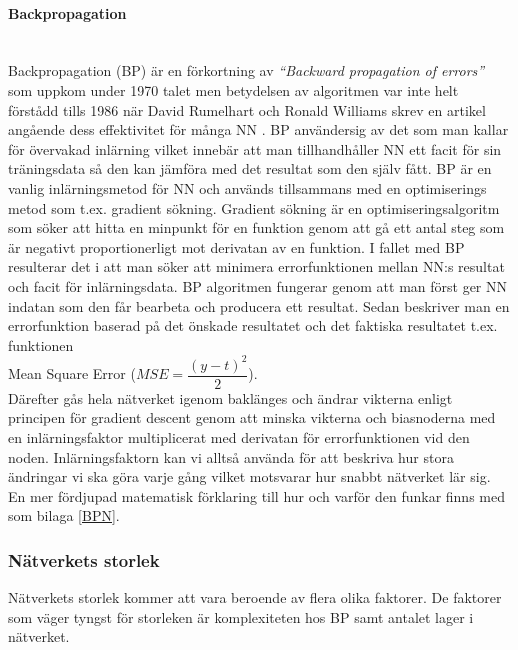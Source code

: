 \documentclass[a4paper,10pt]{article}
\begin{document}
\paragraph{Backpropagation}\hspace{0pt}\\
Backpropagation (BP) är en förkortning av \emph{``Backward propagation of errors''} \autocite{BP} som uppkom under 1970 talet men betydelsen av algoritmen var inte helt förstådd tills 1986 när David Rumelhart och Ronald Williams skrev en artikel angående dess effektivitet för många NN \autocite{NNDL}. BP användersig av det som man kallar för övervakad inlärning vilket innebär att man tillhandhåller NN ett facit för sin träningsdata så den kan jämföra med det resultat som den själv fått. BP är en vanlig inlärningsmetod för NN och används tillsammans med en optimiserings metod som t.ex. gradient sökning. Gradient sökning är en optimiseringsalgoritm som söker att hitta en minpunkt för en funktion genom att gå ett antal steg som är negativt proportionerligt mot derivatan av en funktion\autocite{GD}. I fallet med BP resulterar det i att man söker att minimera errorfunktionen mellan NN:s resultat och facit för inlärningsdata.
BP algoritmen fungerar genom att man först ger NN indatan som den får bearbeta och producera ett resultat. Sedan beskriver man en errorfunktion baserad på det önskade resultatet och det faktiska resultatet t.ex. funktionen \\Mean Square Error ($MSE = \dfrac{(y-t)^2}{2}$). \\Därefter gås hela nätverket igenom baklänges och ändrar vikterna enligt principen för gradient descent genom att minska vikterna och biasnoderna med en inlärningsfaktor multiplicerat med derivatan för errorfunktionen vid den noden. Inlärningsfaktorn kan vi alltså använda för att beskriva hur stora ändringar vi ska göra varje gång vilket motsvarar hur snabbt nätverket lär sig. En mer fördjupad matematisk förklaring till hur och varför den funkar finns med som bilaga \ref{BPN}.

\subsubsection{Nätverkets storlek}
Nätverkets storlek kommer att vara beroende av flera olika faktorer. De faktorer som väger tyngst för storleken är komplexiteten hos BP samt antalet lager i nätverket.
\end{document}
